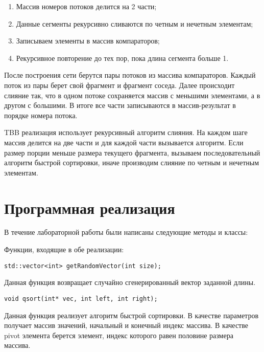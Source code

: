 \documentclass{report}
\begin{document}
\begin{enumerate}
\item Массив номеров потоков делится на 2 части;
\item Данные сегменты рекурсивно сливаются  по четным и нечетным элементам;
\item Записываем элементы в массив компараторов;
\item Рекурсивное повторение до тех пор, пока длина сегмента больше 1.
\end{enumerate}
\par После построения сети берутся пары потоков из массива компараторов. Каждый поток из пары берет свой фрагмент и фрагмент соседа. Далее происходит слияние так, что в одном потоке сохраняется массив с меньшими элементами, а в другом с большими. В итоге все части записываются в массив-результат в порядке номера потока.

\par TBB реализация использует рекурсивный алгоритм слияния. На каждом шаге массив делится на две части и для каждой части вызывается алгоритм.
Если размер порции меньше размера текущего фрагмента, вызываем последовательный алгоритм быстрой сортировки, иначе производим слияние по четным и нечетным элементам.

\newpage

\section*{Программная реализация}

В течение лабораторной работы были написаны следующие методы и классы:
\par Функции, входящие в обе реализации:
\begin{lstlisting}
std::vector<int> getRandomVector(int size);
\end{lstlisting}
\par Данная функция возвращает случайно сгенерированный вектор заданной длины.

\begin{lstlisting}
void qsort(int* vec, int left, int right);
\end{lstlisting}
\par Данная функция реализует алгоритм быстрой сортировки. В качестве параметров получает массив значений, начальный и конечный индекс массива. В качестве pivot элемента берется элемент, индекс которого равен половине размера массива.
\end{document}
